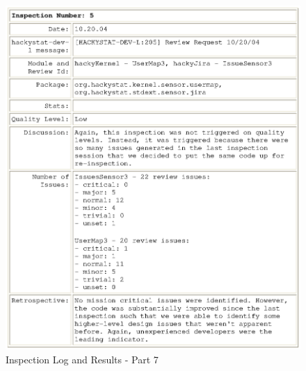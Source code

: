 \begin{figure}[htbp]
  \centering
  \includegraphics[width=1.0\textwidth]{figs/engineeringlog_word_html_7.eps}
  \caption{Inspection Log and Results - Part 7}
  \label{fig:log7}
\end{figure}

